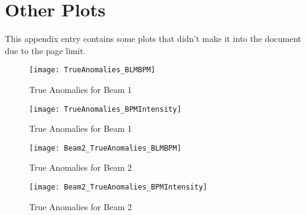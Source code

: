 \section{Other Plots}

\noindent This appendix entry contains some plots that didn't make it into the document due to the page limit.

\begin{figure}[H]
	\centering
	\texttt{[image: TrueAnomalies\_BLMBPM]}
	\caption[True Anomalies 2D (Beam 1-1)]{True Anomalies for Beam 1}
\end{figure}
\begin{figure}[H]
	\centering
	\texttt{[image: TrueAnomalies\_BPMIntensity]}
	\caption[True Anomalies 2D (Beam 1-2)]{True Anomalies for Beam 1}
\end{figure}
\begin{figure}[H]
	\centering
	\texttt{[image: Beam2\_TrueAnomalies\_BLMBPM]}
	\caption[True Anomalies 2D (Beam 2-1)]{True Anomalies for Beam 2}
\end{figure}
\begin{figure}[H]
	\centering
	\texttt{[image: Beam2\_TrueAnomalies\_BPMIntensity]}
	\caption[True Anomalies 2D (Beam 2-2)]{True Anomalies for Beam 2}
\end{figure}